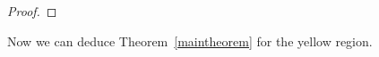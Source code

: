 \documentclass[12pt]{article}
\newcommand{\1}{\mathds{1}}
\theoremstyle{definition}
\theoremstyle{plain}
\theoremstyle{remark}
\begin{document}
\begin{proof}
   \end{proof}
Now we can deduce Theorem~\ref{maintheorem} for the yellow region. 
\end{document}
